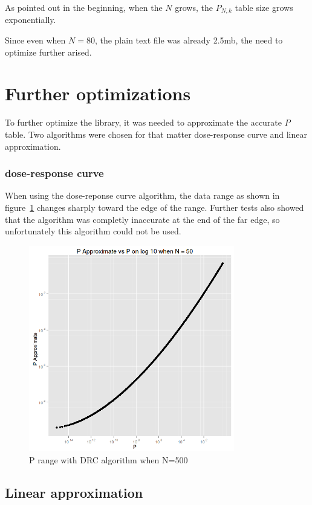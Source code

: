 \documentclass[12pt]{article}
\begin{document}
As pointed out in the beginning, when the $N$ grows, the $P_{N, k}$ table size grows exponentially.

Since even when $N = 80$, the plain text file was already 2.5mb, the need to optimize further arised.

\section{Further optimizations}

To further optimize the library, it was needed to approximate the accurate $P$ table. Two algorithms were chosen for that matter dose-response curve and linear approximation.

\subsubsection{dose-response curve}
When using the dose-reponse curve algorithm, the data range as shown in figure~\ref{fig:PdivPapproxDrcWhenN500} changes sharply toward the edge of the range. Further tests also showed that the algorithm was completly inaccurate at the end of the far edge, so unfortunately this algorithm could not be used.

\begin{figure}[!h]
  \centering
  \includegraphics[width=0.8\textwidth]{PvsP50}
  \caption{P range with DRC algorithm when N=500}
  \label{fig:PdivPapproxDrcWhenN500}
\end{figure}

\subsection{Linear approximation}
\end{document}
